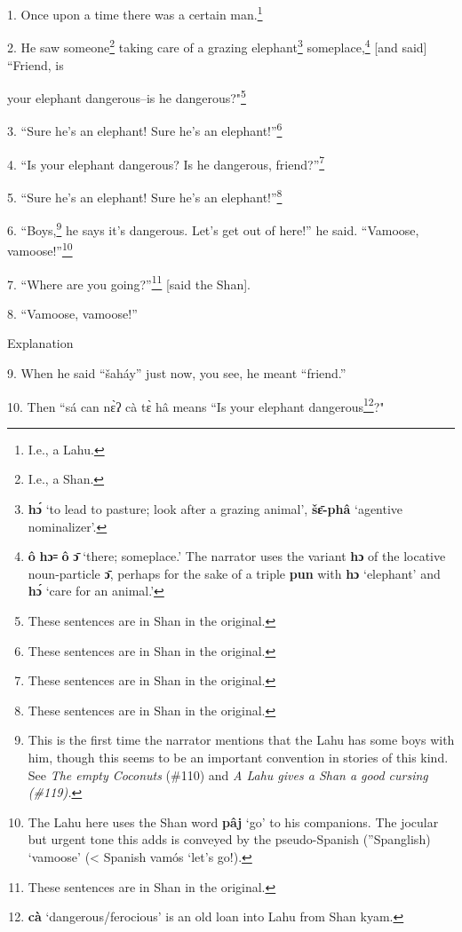 \setcounter{footnote}{0}


1. Once upon a time there was a certain man.\footnote{I.e., a Lahu.}

2. He saw someone\footnote{I.e., a Shan.} taking care of a grazing elephant\footnote{\textbf{hɔ́} `to lead to pasture; look after a grazing animal', \textbf{šɛ̄-phâ} `agentive nominalizer'.} someplace,\footnote{\textbf{ô} \textbf{hɔ꞊} \textbf{ô} \textbf{ɔ̄} `there; someplace.' The narrator uses the variant \textbf{hɔ} of the locative noun-particle \textbf{ɔ̄}, perhaps for the sake of a triple \textbf{pun} with \textbf{hɔ} `elephant' and \textbf{hɔ́} `care for an animal.'} [and
said] ``Friend, is

your elephant dangerous--is he dangerous?"\footnote{These sentences are in Shan in the original.}

3. ``Sure he's an elephant! Sure he's an elephant!''\footnote{These sentences are in Shan in the original.}

4. ``Is your elephant dangerous? Is he dangerous, friend?''\footnote{These sentences are in Shan in the original.}

5. ``Sure he's an elephant! Sure he's an elephant!''\footnote{These sentences are in Shan in the original.}

6. ``Boys,\footnote{This is the first time the narrator mentions that the Lahu has some boys with him, though this seems to be an important convention in stories of this kind. See\textit{ The empty Coconuts} (\#110) and \textit{A Lahu gives a Shan a good cursing (\#119).}} he says it's dangerous. Let's get out of here!''
he said. ``Vamoose, vamoose!''\footnote{The Lahu here uses the Shan word \textbf{pâj} `go' to his companions. The jocular but urgent tone this adds is conveyed by the pseudo-Spanish (''Spanglish) `vamoose' (< Spanish vamós `let's go!).}

7. ``Where are you going?''\footnote{These sentences are in Shan in the original.} [said the Shan].

8. ``Vamoose, vamoose!''

\begin{center}
Explanation
\end{center}


9. When he said ``šaháy'' just now, you see, he meant ``friend.''

10. Then ``sá can nɛ̀ʔ cà tɛ̀ hâ means ``Is your elephant
dangerous\footnote{\textbf{cà} `dangerous/ferocious' is an old loan into Lahu from Shan kyam.}?"

